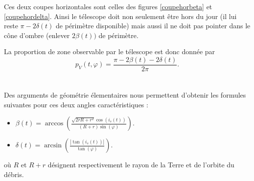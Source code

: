 \documentclass[a4paper,11pt]{article}
\numberwithin{section}{part}
\begin{document}
%

Ces deux coupes horizontales sont celles des figures \ref{coupehorbeta} et \ref{coupehordelta}. Ainsi le t\'elescope doit non seulement \^etre hors du jour (il lui reste $\pi-2\delta(t)$ de p\'erim\`etre disponible) mais aussi il ne doit pas pointer dans le c\^one d'ombre (enlever $2\beta(t))$ de p\'erim\`etre.

%
%
%

La proportion de zone observable par le t\'elescope est donc donn\'ee par $$\displaystyle{p_{V}(t,\varphi)=\frac{\pi-2\beta(t)-2\delta(t)}{2\pi}}.$$ \\
\\
Des arguments de g\'eom\'etrie \'elementaires  nous permettent d'obtenir les formules suivantes pour ces deux angles caract\'eristiques : \\

\begin{itemize}
\item $\displaystyle{\beta(t)=\arccos\left(\frac{\sqrt{2rR+r^2}\cos(i_s(t))}{(R+r)\sin(\varphi)}\right)}$.
\item $\displaystyle{\delta(t)=\arcsin\left(\frac{|\tan(i_s(t))|}{\tan(\varphi)}\right)}$.
\end{itemize}

\vspace{0.5cm}
\noindent o\`u $R$ et $R+r$ d\'esignent respectivement le rayon de la Terre et de l'orbite du d\'ebris.\\
\end{document}
